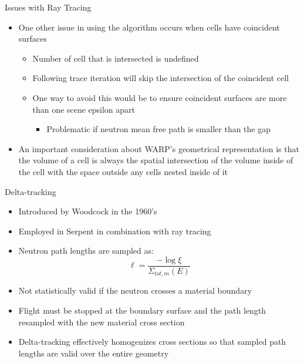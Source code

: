 \documentclass[xcolor=x11names,compress, handout]{beamer}
\renewcommand{\(}{\begin{columns}}
\renewcommand{\)}{\end{columns}}
\newcommand{\<}[1]{\begin{column}{#1}}
\renewcommand{\>}{\end{column}}
\begin{document}
\begin{frame}{Issues with Ray Tracing \cite{warp2015}}
	\begin{itemize}
	\pause
	\item{One other issue in using the algorithm occurs when cells have coincident surfaces}
		\begin{itemize}
		\pause
		\item{Number of cell that is intersected is undefined}
		\pause
		\item{Following trace iteration will skip the intersection of the coincident cell}
		\pause
		\item{One way to avoid this would be to ensure coincident surfaces are more than one scene
		epsilon apart}
			\begin{itemize}
			\pause
			\item{Problematic if neutron mean free path is smaller than the gap}
			\end{itemize}
		\end{itemize}
	\pause
	\item{An important consideration about WARP's geometrical representation is that the volume of a
	cell is always the spatial intersection of the volume inside of the cell with the space outside
	any cells nested inside of it}
	\end{itemize}
\end{frame}


\begin{frame}{Delta-tracking}
	\begin{itemize}
	\pause
	\item{Introduced by Woodcock in the 1960's}
	\pause
	\item{Employed in Serpent in combination with ray tracing \cite{serp_delta}}
	\pause
	\item{Neutron path lengths are sampled as:}
		\begin{equation*}
		\ell = \frac{-\log\xi}{\Sigma_{tot,m}(E)}
		\end{equation*}
	\pause
	\item{Not statistically valid if the neutron crosses a material boundary}
	\pause
	\item{Flight must be stopped at the boundary surface and the path length resampled with the new 
	material cross section}
	\pause
	\item{Delta-tracking effectively homogenizes cross sections so that sampled path lengths are valid
	over the entire geometry}
	\end{itemize}
\end{frame}
\end{document}
